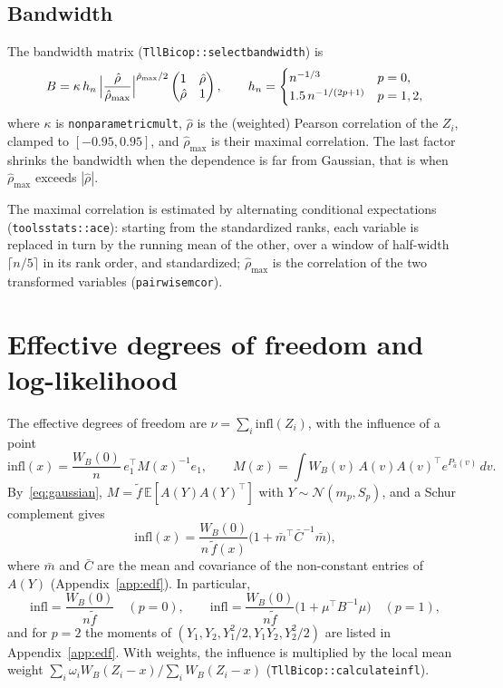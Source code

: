 \documentclass[11pt]{article}
\newcommand{\E}{\mathbb{E}}
\newcommand{\N}{\mathcal{N}}
\newcommand{\codeus}{\textunderscore\allowbreak}
\newcommand{\code}[1]{\begingroup\let\_\codeus\texttt{#1}\endgroup}
\begin{document}
\subsection{Bandwidth}
\label{sec:bandwidth}

The bandwidth matrix (\code{TllBicop::select\_bandwidth}) is
\[
  B = \kappa\, h_n\, \Bigl|\frac{\hat\rho}{\hat\rho_{\max}}\Bigr|^{\hat\rho_{\max}/2}
      \begin{pmatrix} 1 & \hat\rho \\ \hat\rho & 1 \end{pmatrix},
  \qquad
  h_n = \begin{cases}
    n^{-1/3} & p = 0, \\
    1.5\, n^{-1/(2p + 1)} & p = 1, 2,
  \end{cases}
\]
where $\kappa$ is \code{nonparametric\_mult}, $\hat\rho$ is the (weighted)
Pearson correlation of the $Z_i$, clamped to $[-0.95, 0.95]$, and
$\hat\rho_{\max}$ is their maximal correlation. The last factor shrinks the
bandwidth when the dependence is far from Gaussian, that is when
$\hat\rho_{\max}$ exceeds $|\hat\rho|$.

The maximal correlation is estimated by alternating conditional expectations
(\code{tools\_stats::ace}): starting from the standardized ranks, each variable
is replaced in turn by the running mean of the other, over a window of
half-width $\lceil n / 5 \rceil$ in its rank order, and standardized;
$\hat\rho_{\max}$ is the correlation of the two transformed variables
(\code{pairwise\_mcor}).

\section{Effective degrees of freedom and log-likelihood}
\label{sec:edf}

The effective degrees of freedom are $\nu = \sum_i \mathrm{infl}(Z_i)$, with
the influence of a point
\[
  \mathrm{infl}(x) = \frac{W_B(0)}{n}\, e_1^\top M(x)^{-1} e_1, \qquad
  M(x) = \int W_B(v)\, A(v) A(v)^\top e^{P_{\hat a}(v)}\, dv .
\]
By~\eqref{eq:gaussian}, $M = \tilde f\, \E[A(Y) A(Y)^\top]$ with
$Y \sim \N(m_p, S_p)$, and a Schur complement gives
\begin{equation}
  \mathrm{infl}(x) = \frac{W_B(0)}{n\, \tilde f(x)}
    \bigl(1 + \bar m^\top \bar C^{-1} \bar m\bigr),
  \label{eq:infl}
\end{equation}
where $\bar m$ and $\bar C$ are the mean and covariance of the non-constant
entries of $A(Y)$ (Appendix~\ref{app:edf}). In particular,
\[
  \mathrm{infl} = \frac{W_B(0)}{n \tilde f} \quad (p = 0), \qquad
  \mathrm{infl} = \frac{W_B(0)}{n \tilde f}
    \bigl(1 + \mu^\top B^{-1} \mu\bigr) \quad (p = 1),
\]
and for $p = 2$ the moments of $(Y_1, Y_2, Y_1^2/2, Y_1 Y_2, Y_2^2/2)$ are
listed in Appendix~\ref{app:edf}. With weights, the influence is multiplied by
the local mean weight $\sum_i \omega_i W_B(Z_i - x) / \sum_i W_B(Z_i - x)$
(\code{TllBicop::calculate\_infl}).
\end{document}

